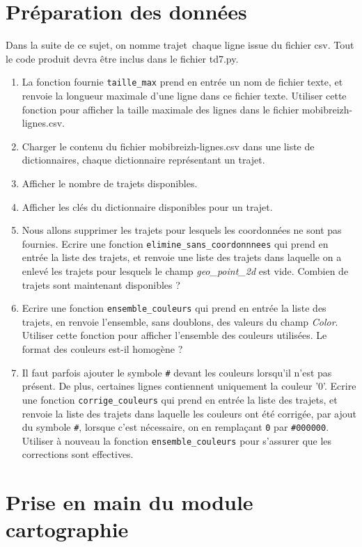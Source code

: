 \documentclass[11pt,a4paper]{article}
\begin{document}
\section{Préparation des données}
Dans la suite de ce sujet, on nomme \og trajet\fg ~chaque ligne issue du fichier csv.
Tout le code produit devra être inclus dans le fichier td7.py.
\begin{enumerate}
\item La fonction fournie \verb+taille_max+ prend en entrée un nom de fichier texte, et renvoie la longueur maximale d'une ligne dans ce fichier texte. Utiliser cette fonction pour afficher la taille maximale des lignes dans le fichier mobibreizh-lignes.csv.

\item Charger le contenu du fichier mobibreizh-lignes.csv dans une liste de dictionnaires, chaque dictionnaire représentant un trajet.
\item Afficher le nombre de trajets disponibles.
\item Afficher les clés du dictionnaire disponibles pour un trajet.
\item Nous allons supprimer les trajets pour lesquels les coordonnées ne sont pas fournies. Ecrire une fonction \verb+elimine_sans_coordonnnees+ qui prend en entrée la liste des trajets, et renvoie une liste des trajets dans laquelle on a enlevé les trajets pour lesquels le champ \emph{geo\_point\_2d} est vide. Combien de trajets sont maintenant disponibles ? 
\item Ecrire une fonction \verb+ensemble_couleurs+ qui prend en entrée la liste des trajets, en renvoie l'ensemble, sans doublons, des valeurs du champ \emph{Color}. Utiliser cette fonction pour afficher l'ensemble des couleurs utilisées. Le format des couleurs est-il homogène ? 
\item Il faut parfois ajouter le symbole \verb+#+ devant les couleurs lorsqu'il n'est pas présent. De plus, certaines lignes contiennent uniquement la couleur '0'. Ecrire une fonction  \verb+corrige_couleurs+ qui prend en entrée la liste des trajets, et renvoie la liste des trajets dans laquelle les couleurs ont été corrigée, par ajout du symbole \verb+#+, lorsque c'est nécessaire, on en remplaçant \verb+0+ par \verb+#000000+. Utiliser à nouveau la fonction  \verb+ensemble_couleurs+ pour s'assurer que les corrections sont effectives.
\end{enumerate}


\section{Prise en main du module cartographie}
\end{document}
